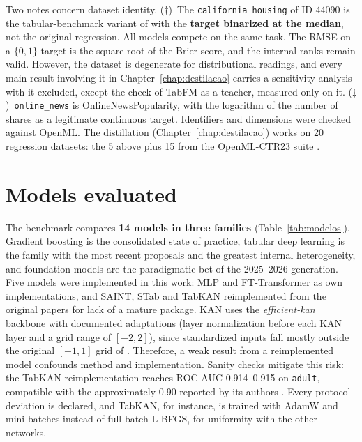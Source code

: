 Two notes concern dataset identity. ($\dagger$)~The
\texttt{california\_\allowbreak housing} of ID 44090 is the
tabular-benchmark variant of \citet{grinsztajn2022} with the
\textbf{target binarized at the median}, not the original
regression. All models compete on the same task. The RMSE on a
$\{0,1\}$ target is the square root of the Brier score, and the
internal ranks remain valid. However, the dataset is degenerate for
distributional readings, and every main result involving it in
Chapter~\ref{chap:destilacao} carries a sensitivity analysis with it
excluded, except the check of TabFM as a teacher, measured only on
it. ($\ddagger$)~\texttt{online\_news} is OnlineNewsPopularity, with
the logarithm of the number of shares as a legitimate continuous
target. Identifiers and dimensions were checked against OpenML. The
distillation (Chapter~\ref{chap:destilacao}) works on 20 regression
datasets: the 5 above plus 15 from the OpenML-CTR23 suite
\citep{fischer2023}.

\section{Models evaluated}
\label{sec:met-modelos}

The benchmark compares \textbf{14 models in three families}
(Table~\ref{tab:modelos}). Gradient boosting is the consolidated
state of practice, tabular deep learning is the family with the most recent proposals and the greatest internal heterogeneity, and foundation models are the paradigmatic bet of the 2025--2026
generation. Five models were implemented in this work: MLP and FT-Transformer as own implementations, and SAINT, STab and TabKAN reimplemented from the original papers for lack of a mature package. KAN uses the
\emph{efficient-kan} backbone with documented adaptations (layer
normalization before each KAN layer and a grid range of $[-2, 2]$),
since standardized inputs fall mostly outside the original
$[-1, 1]$ grid of \citet{kan2024}. Therefore, a weak result from a
reimplemented model confounds method and implementation. Sanity
checks mitigate this risk: the TabKAN reimplementation reaches
ROC-AUC 0.914--0.915 on \texttt{adult}, compatible with the
approximately 0.90 reported by its authors \citep{tabkan2025}. Every
protocol deviation is declared, and TabKAN, for instance, is trained
with AdamW and mini-batches instead of full-batch L-BFGS, for
uniformity with the other networks.


